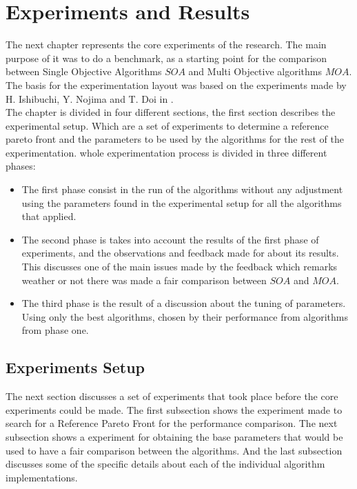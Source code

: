 \chapter{Experiments and Results}
\label{chapter:chapter05}

The next chapter represents the core experiments of the research. The main purpose of it was to do a benchmark, as a starting point for the comparison between Single Objective Algorithms $SOA$ and Multi Objective algorithms $MOA$. The basis for the experimentation layout was based on the experiments made by H. Ishibuchi, Y. Nojima and T. Doi in \cite{Ishibuchi_single_vs_multiobjective}. \\

The chapter is divided in four different sections, the first section describes the experimental setup. Which are a set of experiments to determine a reference pareto front and the parameters to be used by the algorithms for the rest of the experimentation. whole experimentation process is divided in three different phases: 

\begin{itemize}
    \item The first phase consist in the run of the algorithms without any adjustment using the parameters found in the experimental setup for all the algorithms that applied. 
    \item The second phase is takes into account the results of the first phase of experiments, and the observations and feedback made for about its results. This discusses one of the main issues made by the feedback which remarks weather or not there was made a fair comparison between $SOA$ and $MOA$.
    \item The third phase is the result of a discussion about the tuning of parameters. Using only the best algorithms, chosen by their performance from algorithms from phase one. 
\end{itemize}

\section{Experiments Setup}

The next section discusses a set of experiments that took place before the core experiments could be made. The first subsection shows the experiment made to search for a Reference Pareto Front for the performance comparison. The next subsection shows a experiment for obtaining the base parameters that would be used to have a fair comparison between the algorithms. And the last subsection discusses some of the specific details about each of the individual algorithm implementations.

